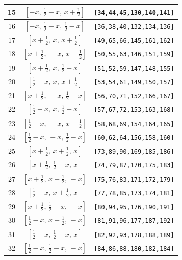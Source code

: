 \documentclass[fleqn,8pt]{jsarticle}
\begin{document}
\begin{longtable}{ccc}
15 & $\left[ - x,\, \frac{1}{2} - x,\, x + \frac{1}{2} \right]$ & {\tt [34,44,45,130,140,141]} \\ \hline
16 & $\left[ - x,\, \frac{1}{2} - x,\, \frac{1}{2} - x \right]$ & {\tt [36,38,40,132,134,136]} \\ \hline
17 & $\left[ x + \frac{1}{2},\, x,\, x + \frac{1}{2} \right]$ & {\tt [49,65,66,145,161,162]} \\ \hline
18 & $\left[ x + \frac{1}{2},\, - x,\, x + \frac{1}{2} \right]$ & {\tt [50,55,63,146,151,159]} \\ \hline
19 & $\left[ x + \frac{1}{2},\, x,\, \frac{1}{2} - x \right]$ & {\tt [51,52,59,147,148,155]} \\ \hline
20 & $\left[ \frac{1}{2} - x,\, x,\, x + \frac{1}{2} \right]$ & {\tt [53,54,61,149,150,157]} \\ \hline
21 & $\left[ x + \frac{1}{2},\, - x,\, \frac{1}{2} - x \right]$ & {\tt [56,70,71,152,166,167]} \\ \hline
22 & $\left[ \frac{1}{2} - x,\, x,\, \frac{1}{2} - x \right]$ & {\tt [57,67,72,153,163,168]} \\ \hline
23 & $\left[ \frac{1}{2} - x,\, - x,\, x + \frac{1}{2} \right]$ & {\tt [58,68,69,154,164,165]} \\ \hline
24 & $\left[ \frac{1}{2} - x,\, - x,\, \frac{1}{2} - x \right]$ & {\tt [60,62,64,156,158,160]} \\ \hline
25 & $\left[ x + \frac{1}{2},\, x + \frac{1}{2},\, x \right]$ & {\tt [73,89,90,169,185,186]} \\ \hline
26 & $\left[ x + \frac{1}{2},\, \frac{1}{2} - x,\, x \right]$ & {\tt [74,79,87,170,175,183]} \\ \hline
27 & $\left[ x + \frac{1}{2},\, x + \frac{1}{2},\, - x \right]$ & {\tt [75,76,83,171,172,179]} \\ \hline
28 & $\left[ \frac{1}{2} - x,\, x + \frac{1}{2},\, x \right]$ & {\tt [77,78,85,173,174,181]} \\ \hline
29 & $\left[ x + \frac{1}{2},\, \frac{1}{2} - x,\, - x \right]$ & {\tt [80,94,95,176,190,191]} \\ \hline
30 & $\left[ \frac{1}{2} - x,\, x + \frac{1}{2},\, - x \right]$ & {\tt [81,91,96,177,187,192]} \\ \hline
31 & $\left[ \frac{1}{2} - x,\, \frac{1}{2} - x,\, x \right]$ & {\tt [82,92,93,178,188,189]} \\ \hline
32 & $\left[ \frac{1}{2} - x,\, \frac{1}{2} - x,\, - x \right]$ & {\tt [84,86,88,180,182,184]} \\
\end{longtable}
\end{document}
